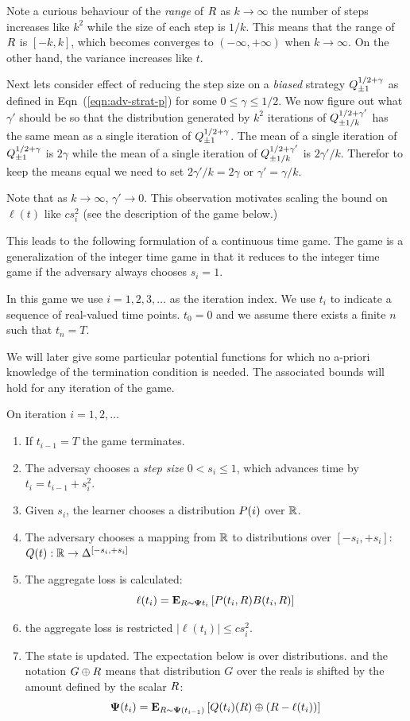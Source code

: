\documentclass{article}[12pt]
\begin{document}
Note a curious behaviour of the {\em range} of $R$ as $k \to \infty$
the number of steps increases like $k^2$ while the size of each step
is $1/k$. This means that the range of $R$ is $[-k,k]$, which becomes
converges to $(-\infty, + \infty)$ when $k \to \infty$. On the other
hand, the variance increases like $t$.

Next lets consider effect of reducing the step size on a {\em biased}
strategy $Q^{1/2+\gamma}_{\pm 1}$ as defined in
Eqn~(\ref{eqn:adv-strat-p}) for some
$0\leq \gamma \leq 1/2$.  We now figure out what  $\gamma'$ should be
so that the distribution generated by $k^2$ iterations of $Q^{1/2+\gamma'}_{\pm 1/k}$ has the
same mean as a single iteration of $Q^{1/2+\gamma}_{\pm
  1}$. The mean of a single iteration of
$Q^{1/2+\gamma}_{\pm 1}$ is $2\gamma$ while the mean of a
single iteration of $Q^{1/2+\gamma'}_{\pm 1/k}$ is
$2\gamma'/k$. Therefor to keep the means equal we need to set
$2\gamma'/k = 2\gamma$ or $\gamma' = \gamma/k$.


Note that as $k \to \infty$, $\gamma' \to 0$. This observation
motivates scaling the bound on $\ell(t)$ like $c s_i^2$ (see the
description of the game below.)



This leads to the following formulation of a continuous time game.
The game is a generalization of the integer time game in that it
reduces to the integer time game if the adversary always chooses $s_i=1$. 

In this game we use $i=1,2,3,\ldots$ as the iteration index. We use
$t_i$ to indicate a sequence of real-valued time points. $t_0=0$ and
we assume there exists a finite $n$ such that $t_n = T$.

We will later give some particular potential functions for which no
a-priori knowledge of the termination condition is needed. The
associated bounds will hold for any iteration of the game.
\vspace{1cm}

On iteration $i=1,2,\ldots$
\begin{enumerate}
\item  If $t_{i-1}=T$ the game terminates.
\item The adversay chooses a {\em step size} $0<s_i\leq 1$, which advances
  time by $t_i = t_{i-1}+s_i^2$.
\item Given $s_i$, the learner chooses a distribution $P(i)$ over $\mathbb{R}$.
\item The adversary chooses a mapping from $\mathbb{R}$ to distributions
  over $[-s_i,+s_i]$: $Q(t): \mathbb{R} \to \Delta^{[-s_i,+s_i]}$
\item The aggregate loss is calculated:
  $$ \ell(t_i)={\bf E}_{R \sim {\bf \Psi}{t_i}}\left[ P(t_i,R) B(t_i,R) \right]$$
\item the aggregate loss is restricted $|\ell(t_i)| \leq c s_i^2$.
\item The state is updated. The expectation below is over
  distributions. and the notation $G \oplus R$ means
  that distribution $G$ over the reals is shifted by the amount
  defined by the scalar $R$:
  $${\bf \Psi}(t_i) = {\bf E}_{R \sim {\bf \Psi}(t_{i-1})}\left[ Q(t_i)(R)\oplus (R-\ell(t_i)) \right]
  $$
\end{enumerate}
\end{document}
